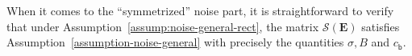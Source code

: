 When it comes to the ``symmetrized'' noise part, it is straightforward to verify
that under Assumption~\ref{assump:noise-general-rect}, 
the matrix
$\mathcal{S}(\bm{E})$ satisfies Assumption~\ref{assumption-noise-general}
with precisely the quantities $\sigma, B$ and $c_{\mathsf{b}}$. 



%
